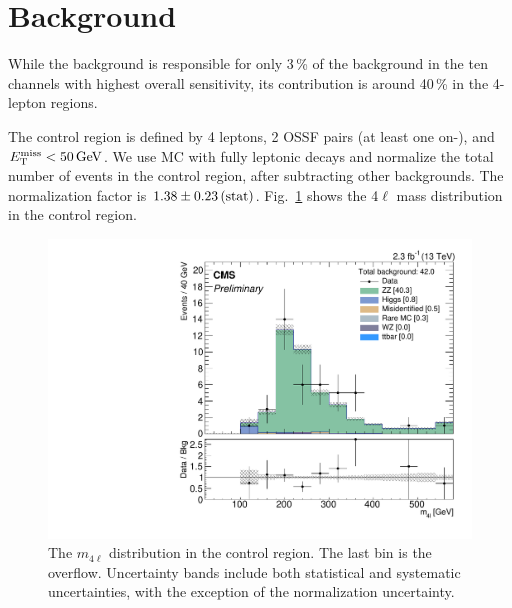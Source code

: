 \section{\texorpdfstring{\ZZ}{ZZ} Background}
\label{sec:bkg_ZZ}

While the \ZZ background is responsible for only 3\,\% of the background in the ten channels with highest overall sensitivity, its contribution is around 40\,\% in the 4-lepton regions.

The control region is defined by 4 leptons, 2 OSSF pairs (at least one on-\Z), and $E_{\mathrm{T}}^{\text{miss}} < 50\,\text{Ge\hspace{-.08em}V}$. We use \ZZ MC with fully leptonic decays and normalize the total number of events in the control region, after subtracting other backgrounds. The normalization factor is $1.38 \pm 0.23\,\text{(stat)}$. Fig.~\ref{fig:ZZ} shows the 4$\ell$ mass distribution in the control region.

\begin{figure}
\begin{center}
	\includegraphics[width=.7\textwidth]{Background/bkg_ZZ/ZZ_DYz2MET0to50HT0to200_MLIGHTLEPTONS}
	\caption{The $m_{4\ell}$ distribution in the \ZZ control region. The last bin is the overflow. Uncertainty bands include both statistical and systematic uncertainties, with the exception of the \ZZ normalization uncertainty.
	\label{fig:ZZ}}
\end{center}
\end{figure}
